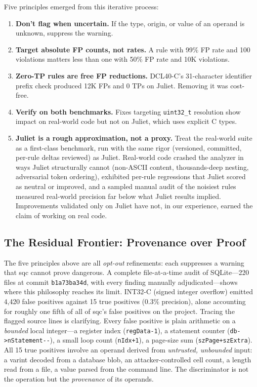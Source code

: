 Five principles emerged from this iterative process:

\begin{enumerate}
    \item \textbf{Don't flag when uncertain.}  If the type, origin,
        or value of an operand is unknown, suppress the warning.
    \item \textbf{Target absolute FP counts, not rates.}  A rule with
        99\% FP rate and 100 violations matters less than one with
        50\% FP rate and 10K violations.
    \item \textbf{Zero-TP rules are free FP reductions.}  DCL40-C's
        31-character identifier prefix check produced 12K FPs and 0 TPs
        on Juliet.  Removing it was cost-free.
    \item \textbf{Verify on both benchmarks.}  Fixes targeting
        \texttt{uint32\_t} resolution show impact on real-world code
        but not on Juliet, which uses explicit C types.
    \item \textbf{Juliet is a rough approximation, not a proxy.}
        Treat the real-world suite as a first-class benchmark, run
        with the same rigor (versioned, committed, per-rule deltas
        reviewed) as Juliet.  Real-world code crashed the analyzer in
        ways Juliet structurally cannot (non-ASCII content,
        thousands-deep nesting, adversarial token ordering), exhibited
        per-rule regressions that Juliet scored as neutral or
        improved, and a sampled manual audit of the noisiest rules
        measured real-world precision far below what Juliet results
        implied.  Improvements validated only on Juliet have not, in
        our experience, earned the claim of working on real code.
\end{enumerate}

\subsection{The Residual Frontier: Provenance over Proof}
\label{sec:provenance-frontier}

The five principles above are all \emph{opt-out} refinements: each
suppresses a warning that sqc cannot prove dangerous.  A complete
file-at-a-time audit of SQLite---220 files at commit
\texttt{b1a73ba34d}, with every finding manually adjudicated---shows
where this philosophy reaches its limit.  INT32-C (signed integer
overflow) emitted 4{,}420 false positives against 15 true positives
(0.3\% precision), alone accounting for roughly one fifth of all of
sqc's false positives on the project.  Tracing the flagged source
lines is clarifying.  Every false positive is plain arithmetic on a
\emph{bounded} local integer---a register index (\texttt{regData-1}),
a statement counter (\texttt{db->nStatement-{}-}), a small loop count
(\texttt{nIdx+1}), a page-size sum (\texttt{szPage+szExtra}).  All 15
true positives involve an operand derived from \emph{untrusted,
unbounded} input: a varint decoded from a database blob, an
attacker-controlled cell count, a length read from a file, a value
parsed from the command line.  The discriminator is not the operation
but the \emph{provenance} of its operands.

